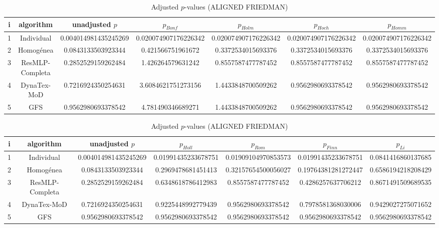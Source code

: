 \documentclass[a4paper,10pt]{article}
\begin{document}
\begin{landscape}
\begin{table}[!htp]
\centering\scriptsize
\caption{Adjusted $p$-values (ALIGNED FRIEDMAN)}
\begin{tabular}{ccccccc}
i&algorithm&unadjusted $p$&$p_{Bonf}$&$p_{Holm}$&$p_{Hoch}$&$p_{Homm}$\\
\hline
1&Individual&0.004014981435245269&0.020074907176226342&0.020074907176226342&0.020074907176226342&0.020074907176226342\\
2&Homogénea&0.0843133503923344&0.421566751961672&0.3372534015693376&0.3372534015693376&0.3372534015693376\\
3&ResMLP-Completa&0.2852529159262484&1.426264579631242&0.8557587477787452&0.8557587477787452&0.8557587477787452\\
4&DynaTex-MoD&0.7216924350254631&3.6084621751273156&1.4433848700509262&0.9562980693378542&0.9562980693378542\\
5&GFS&0.9562980693378542&4.781490346689271&1.4433848700509262&0.9562980693378542&0.9562980693378542\\
\hline
\end{tabular}
\end{table}

\begin{table}[!htp]
\centering\scriptsize
\caption{Adjusted $p$-values (ALIGNED FRIEDMAN)}
\begin{tabular}{ccccccc}
i&algorithm&unadjusted $p$&$p_{Holl}$&$p_{Rom}$&$p_{Finn}$&$p_{Li}$\\
\hline
1&Individual&0.004014981435245269&0.01991435233678751&0.01909104970853573&0.01991435233678751&0.0841416860137685\\
2&Homogénea&0.0843133503923344&0.2969478681451413&0.32157654500056027&0.19764381281272447&0.6586194218208429\\
3&ResMLP-Completa&0.2852529159262484&0.6348618786412983&0.8557587477787452&0.4286257637706212&0.8671491509689535\\
4&DynaTex-MoD&0.7216924350254631&0.9225448992779439&0.9562980693378542&0.7978581368030006&0.9429027275071652\\
5&GFS&0.9562980693378542&0.9562980693378542&0.9562980693378542&0.9562980693378542&0.9562980693378542\\
\hline
\end{tabular}
\end{table}


\newpage


\end{landscape}
\end{document}
